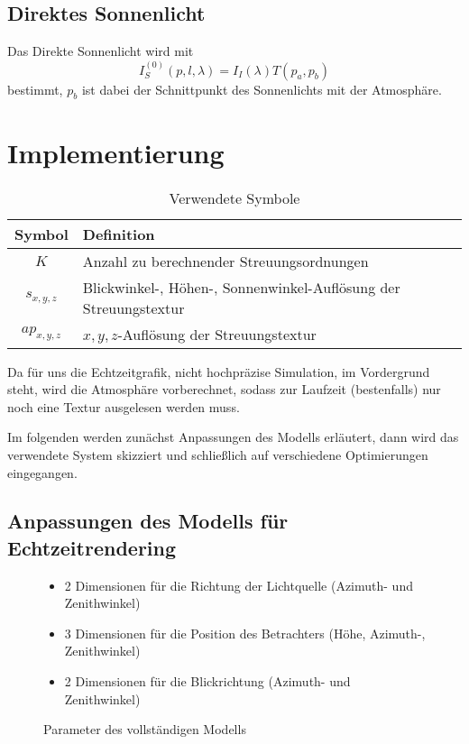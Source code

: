 \subsection{Direktes Sonnenlicht}
Das Direkte Sonnenlicht wird mit
\begin{equation*}
	I^{(0)}_S(p,l,\lambda) = I_I(\lambda)T(p_a, p_b)
\end{equation*}
bestimmt, $p_b$ ist dabei der Schnittpunkt des Sonnenlichts mit der Atmosphäre.

\section{Implementierung}

\begin{table}[h]
	\centering
	\begin{tabular}{| c | p{15em} |}
	\hline
	Symbol & Definition \\ \hline
	$K$ & Anzahl zu berechnender Streuungsordnungen\\
	$s_{x,y,z}$ & Blickwinkel-, Höhen-, Sonnenwinkel-Auflösung der Streuungstextur\\
	$ap_{x,y,z}$ & $x,y,z$-Auflösung der Streuungstextur\\ \hline
	\end{tabular}
	\caption{Verwendete Symbole}
	\label{symbols}
\end{table}

Da für uns die Echtzeitgrafik, nicht hochpräzise Simulation, im Vordergrund steht, wird die Atmosphäre vorberechnet,
sodass zur Laufzeit (bestenfalls) nur noch eine Textur ausgelesen werden muss.

Im folgenden werden zunächst Anpassungen des Modells erläutert, dann wird das verwendete System skizziert und schließlich auf
verschiedene Optimierungen eingegangen.

\subsection{Anpassungen des Modells für Echtzeitrendering}
\begin{figure}[h]
\begin{mdframed}
\begin{itemize}
\item 2 Dimensionen für die Richtung der Lichtquelle (Azimuth- und Zenithwinkel)
\item 3 Dimensionen für die Position des Betrachters (Höhe, Azimuth-, Zenithwinkel)
\item 2 Dimensionen für die Blickrichtung (Azimuth- und Zenithwinkel)
\end{itemize}
\end{mdframed}
\caption{Parameter des vollständigen Modells}
\label{params:full}
\end{figure}

